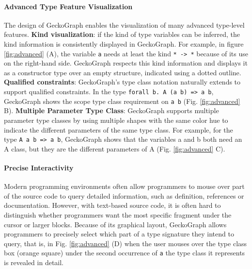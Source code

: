 \paragraph{Advanced Type Feature Visualization}
The design of GeckoGraph enables the visualization of many advanced type-level features. \textbf{Kind visualization}: if the kind of type variables can be inferred, the kind information is consistently displayed in GeckoGraph. For example, in figure \ref{fig:advanced} (A), the variable \texttt{a} needs at least the kind \texttt{* -> *} because of its use on the right-hand side. GeckoGraph respects this kind information and displays it as a constructor type over an empty structure, indicated using a dotted outline.  \textbf{Qualified constraints}: GeckoGraph's type class notation naturally extends to support qualified constraints. In the type \texttt{forall b. A (a b) => a b}, GeckoGraph shows the scope type class requirement on \texttt{a b} (Fig. \ref{fig:advanced} B).
\textbf{Multiple Parameter Type Class}:  GeckoGraph supports multiple parameter type classes by using multiple shapes with the same color hue to indicate the different parameters of the same type class.  For example, for the type \texttt{A a b => a b},  GeckoGraph shows that the variables a and b both need an A class, but they are the different parameters of A (Fig. \ref{fig:advanced} C).

\paragraph{Precise Interactivity}
Modern programming environments often allow programmers to mouse over part of the source code to query detailed information, such as definition, references or documentation. However, with text-based source code, it is often hard to distinguish whether programmers want the most specific fragment under the cursor or larger blocks. Because of its graphical layout, GeckoGraph allows programmers to precisely select which part of a type signature they intend to query, that is, in Fig. \ref{fig:advanced} (D) when the user mouses over the type class box (orange square) under the second occurrence of \texttt{a} the type class it represents is revealed in detail. 

